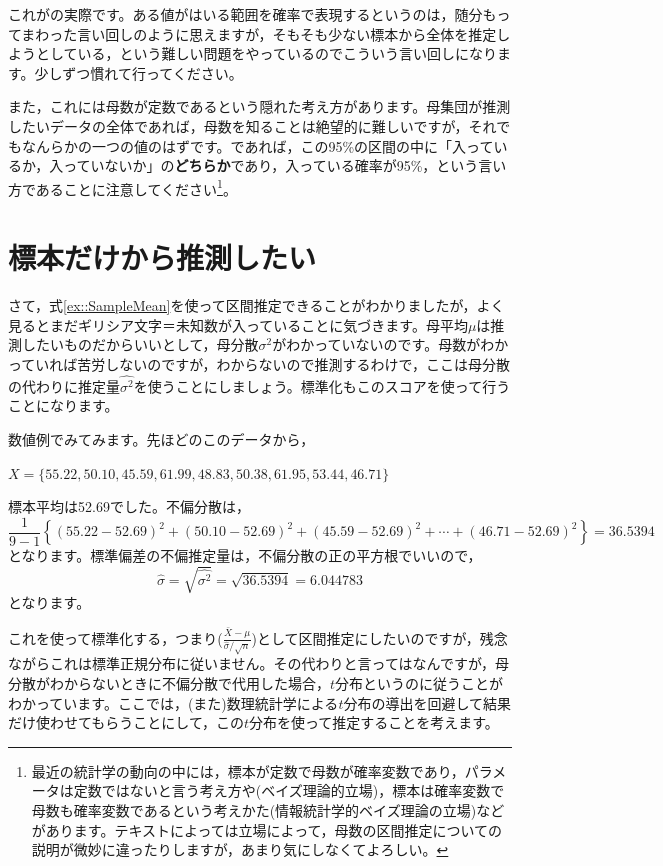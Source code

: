 \documentclass{ltjsbook}
\begin{document}
これがの実際です。ある値がはいる範囲を確率で表現するというのは，随分もってまわった言い回しのように思えますが，そもそも少ない標本から全体を推定しようとしている，という難しい問題をやっているのでこういう言い回しになります。少しずつ慣れて行ってください。

また，これには母数が定数であるという隠れた考え方があります。母集団が推測したいデータの全体であれば，母数を知ることは絶望的に難しいですが，それでもなんらかの一つの値のはずです。であれば，この95\%の区間の中に「入っているか，入っていないか」の\textbf{どちらか}であり，入っている確率が95\%，という言い方であることに注意してください\footnote{最近の統計学の動向の中には，標本が定数で母数が確率変数であり，パラメータは定数ではないと言う考え方や(ベイズ理論的立場)，標本は確率変数で母数も確率変数であるという考えかた(情報統計学的ベイズ理論の立場)などがあります。テキストによっては立場によって，母数の区間推定についての説明が微妙に違ったりしますが，あまり気にしなくてよろしい。}。

\section{標本だけから推測したい}
さて，式\ref{ex::SampleMean}を使って区間推定できることがわかりましたが，よく見るとまだギリシア文字＝未知数が入っていることに気づきます。母平均$\mu$は推測したいものだからいいとして，母分散$\sigma^2$がわかっていないのです。母数がわかっていれば苦労しないのですが，わからないので推測するわけで，ここは母分散の代わりに推定量$\hat{\sigma^2}$を使うことにしましょう。標準化もこのスコアを使って行うことになります。

数値例でみてみます。先ほどのこのデータから，
\begin{tcolorbox}
    $X = \{ 55.22, 50.10, 45.59, 61.99, 48.83, 50.38, 61.95, 53.44, 46.71\}$
\end{tcolorbox}
標本平均は52.69でした。不偏分散は，
$$ \frac{1}{9-1}\left\{ (55.22-52.69)^2+(50.10-52.69)^2+(45.59-52.69)^2+\cdots+(46.71-52.69)^2 \right\}=36.5394$$
となります。標準偏差の不偏推定量は，不偏分散の正の平方根でいいので，
$$ \hat{\sigma}=\sqrt{\hat{\sigma^2}}= \sqrt{36.5394}=6.044783 $$
となります。

これを使って標準化する，つまり($\frac{\bar{X}-\mu}{\hat{\sigma}/\sqrt{n}}$)として区間推定にしたいのですが，残念ながらこれは標準正規分布に従いません。その代わりと言ってはなんですが，母分散がわからないときに不偏分散で代用した場合，$t$分布というのに従うことがわかっています。ここでは，(また)数理統計学による$t$分布の導出を回避して結果だけ使わせてもらうことにして，この$t$分布を使って推定することを考えます。
\end{document}
